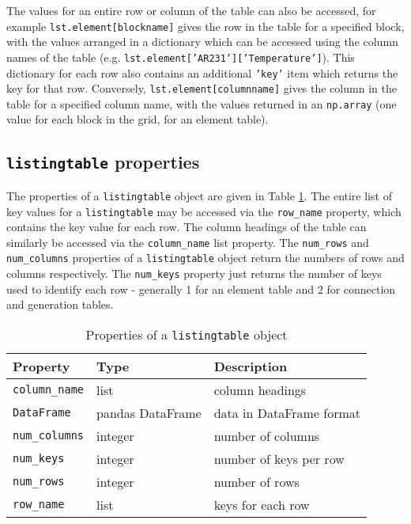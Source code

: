The values for an entire row or column of the table can also be accessed, for example \texttt{lst.element[blockname]} gives the row in the table for a specified block, with the values arranged in a dictionary which can be accessed using the column names of the table (e.g. \texttt{lst.element['AR231']['Temperature']}).  This dictionary for each row also contains an additional \texttt{'key'} item which returns the key for that row.  Conversely, \texttt{lst.element[columnname]} gives the column in the table for a specified column name, with the values returned in an \texttt{np.array} (one value for each block in the grid, for an element table).

\subsection{\texttt{listingtable} properties}

The properties of a \texttt{listingtable} object are given in Table \ref{tb:listingtable_properties}.  The entire list of key values for a \texttt{listingtable} may be accessed via the \texttt{row\_name} property, which contains the key value for each row.  The column headings of the table can similarly be accessed via the \texttt{column\_name} list property.  The \texttt{num\_rows} and \texttt{num\_columns} properties of a \texttt{listingtable} object return the numbers of rows and columns respectively.  The \texttt{num\_keys} property just returns the number of keys used to identify each row - generally 1 for an element table and 2 for connection and generation tables.

\begin{table}
  \begin{center}
    \begin{tabular}{|l|l|l|}
      \hline
      \textbf{Property} & \textbf{Type} & \textbf{Description}\\
      \hline
      \texttt{column\_name} & list & column headings\\
      \texttt{DataFrame} & pandas DataFrame & data in DataFrame format\\
      \texttt{num\_columns} & integer & number of columns \\
      \texttt{num\_keys} & integer & number of keys per row \\
      \texttt{num\_rows} & integer & number of rows \\
      \texttt{row\_name} & list & keys for each row \\
      \hline
    \end{tabular}
    \caption{Properties of a \texttt{listingtable} object}
    \label{tb:listingtable_properties}
  \end{center}
\end{table}

